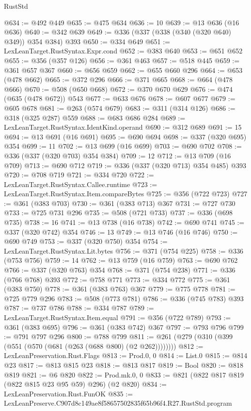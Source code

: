 \begin{lexlean}{RustStd}
\begin{coremodule}
@634 := @492 @449
@635 := @475 @634
@636 := 10
@639 := @13 @636 (@16 @636)
@640 := @342 @639
@649 := @336 (@337 (@338 (@340 (@320 @640) @349)) @354 @384) @393
@650 := @334 @649
@651 := LexLeanTarget.RustSyntax.Expr.cond
@652 := @383 @640
@653 := @651 @652
@655 := @356 (@357 @126)
@656 := @361 @463
@657 := @518 @445
@659 := @361 @657 @367
@660 := @656 @659
@662 := @655 @660 @296
@664 := @653 (@478 @662)
@665 := @372 @296
@666 := @371 @665
@668 := @664 (@478 @666)
@670 := @508 (@650 @668)
@672 := @370 @670 @629
@676 := @474 (@635 (@478 @672)) @543
@677 := @633 @676
@678 := @607 @677
@679 := @605 @678
@681 := @263 (@574 @679)
@683 := @311 (@314 @126)
@686 := @318 (@325 @287) @559
@688 := @683 @686 @284
@689 := LexLeanTarget.RustSyntax.IdentKind.operand
@690 := @312 @689
@691 := 15
@694 := @13 @691 (@16 @691)
@695 := @690 @694
@698 := @337 (@320 @695) @354
@699 := 11
@702 := @13 @699 (@16 @699)
@703 := @690 @702
@708 := @336 (@337 (@320 @703) @354 @384)
@709 := 12
@712 := @13 @709 (@16 @709)
@713 := @690 @712
@719 := @336 (@337 (@320 @713) @354 @485) @393
@720 := @708 @719
@721 := @334 @720
@722 := LexLeanTarget.RustSyntax.Callee.runtime
@723 := LexLeanTarget.RustSyntax.Item.compareBytes
@725 := @356 (@722 @723)
@727 := @361 (@383 @703)
@730 := @361 (@383 @713) @367
@731 := @727 @730
@733 := @725 @731 @296
@735 := @508 (@721 @733)
@737 := @336 (@698 @735)
@738 := 16
@741 := @13 @738 (@16 @738)
@742 := @690 @741
@745 := @337 (@320 @742) @354
@746 := 13
@749 := @13 @746 (@16 @746)
@750 := @690 @749
@753 := @337 (@320 @750) @354
@754 := LexLeanTarget.RustSyntax.Lit.bytes
@756 := @371 (@754 @225)
@758 := @336 (@753 @756)
@759 := 14
@762 := @13 @759 (@16 @759)
@763 := @690 @762
@766 := @337 (@320 @763) @354
@768 := @371 (@754 @238)
@771 := @336 (@766 @768) @393
@772 := @758 @771
@773 := @334 @772
@775 := @361 (@383 @750)
@778 := @361 (@383 @763) @367
@779 := @775 @778
@781 := @725 @779 @296
@783 := @508 (@773 @781)
@786 := @336 (@745 @783) @393
@787 := @737 @786
@788 := @334 @787
@789 := LexLeanTarget.RustSyntax.Item.equal
@791 := @356 (@722 @789)
@793 := @361 (@383 @695)
@796 := @361 (@383 @742) @367
@797 := @793 @796
@799 := @791 @797 @296
@800 := @788 @799
@811 := @261 (@279 (@310 (@399 (@551 (@570 (@681 (@263 (@688 @800) (@2 @262))))))))
@812 := LexLeanPreservation.Rust.Flags
@813 := Prod.{0, 0}
@814 := List.{0}
@815 := @814 @23
@817 := @813 @815 @23
@818 := @813 @817
@819 := Bool
@820 := @818 @819
@821 := @6 @820
@822 := Prod.mk.{0, 0}
@833 := @821 (@822 @817 @819 (@822 @815 @23 @95 @59) @296) (@2 @820)
@834 := LexLeanPreservation.Rust.FunOK
@835 := LexLeanPreserve.C907d8c149ae8f58657502835f65b96f4.R27.RustStd.program

\end{coremodule}
\end{lexlean}
